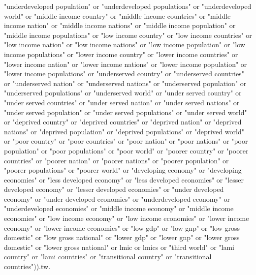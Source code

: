 \documentclass[12pt]{article}
\begin{document}
"underdeveloped population" or "underdeveloped populations" or "underdeveloped world" or "middle income country" or "middle income countries" or "middle income nation" or "middle income nations" or "middle income population" or "middle income populations" or "low income country" or "low income countries" or "low income nation" or "low income nations" or "low income population" or "low income populations" or "lower income country" or "lower income countries" or "lower income nation" or "lower income nations" or "lower income population" or "lower income populations" or "underserved country" or "underserved countries" or "underserved nation" or "underserved nations" or "underserved population" or "underserved populations" or "underserved world" or "under served country" or "under served countries" or "under served nation" or "under served nations" or "under served population" or "under served populations" or "under served world" or "deprived country" or "deprived countries" or "deprived nation" or "deprived nations" or "deprived population" or "deprived populations" or "deprived world" or "poor country" or "poor countries" or "poor nation" or "poor nations" or "poor population" or "poor populations" or "poor world" or "poorer country" or "poorer countries" or "poorer nation" or "poorer nations" or "poorer population" or "poorer populations" or "poorer world" or "developing economy" or "developing economies" or "less developed economy" or "less developed economies" or "lesser developed economy" or "lesser developed economies" or "under developed economy" or "under developed economies" or "underdeveloped economy" or "underdeveloped economies" or "middle income economy" or "middle income economies" or "low income economy" or "low income economies" or "lower income economy" or "lower income economies" or "low gdp" or "low gnp" or "low gross domestic" or "low gross national" or "lower gdp" or "lower gnp" or "lower gross domestic" or "lower gross national" or lmic or lmics or "third world" or "lami country" or "lami countries" or "transitional country" or "transitional countries")).tw.



\clearpage
\newrefcontext[sorting=nyt]
\printbibliography
\end{document}
